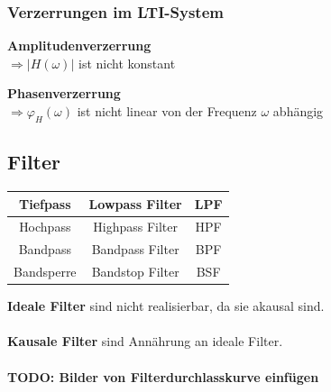 	\subsubsection{Verzerrungen im LTI-System}
		\begin{minipage}[t]{7cm}
			\textbf{Amplitudenverzerrung}\\
				$\Rightarrow |H(\omega)|$ ist nicht konstant 
				
		\end{minipage}
		\begin{minipage}[t]{10cm}
			\textbf{Phasenverzerrung}\\
				$\Rightarrow \varphi_H (\omega)$ ist nicht linear von der Frequenz $\omega$ abhängig
		\end{minipage}


	\subsection{Filter }
		\begin{multicols}{2}
			\begin{center}
				\begin{tabular}{|c|c|c|}
					\hline
					Tiefpass & Lowpass Filter & LPF \\
					\hline
					Hochpass & Highpass Filter & HPF \\
					\hline
					Bandpass & Bandpass Filter & BPF \\
					\hline
					Bandsperre & Bandstop Filter & BSF \\
					\hline
				\end{tabular}
			\end{center}
		\columnbreak
		\textbf{Ideale Filter} sind nicht realisierbar, da sie akausal sind.\\ \\
		\textbf{Kausale Filter} sind Ann\"ahrung an ideale Filter. \\ \\
		\textbf{TODO: Bilder von Filterdurchlasskurve einfügen}
	\end{multicols}


